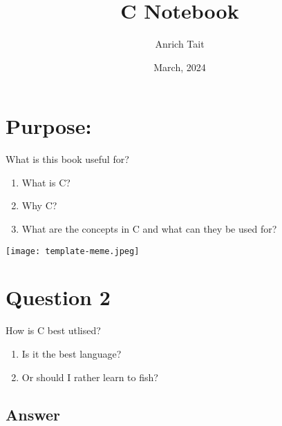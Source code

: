 \documentclass[
	12pt, %
]{fphw}
\title{C Notebook} %
\author{Anrich Tait} %
\date{March, 2024} %
\institute{ALX \\ Software Engineering} %
\begin{document}
\maketitle %


\section*{Purpose:}

\begin{problem}
	What is this book useful for?
	\begin{enumerate}
		\item What is C?
		\item Why C?
		\item What are the concepts in C and what can they be used for?
	\end{enumerate}
\end{problem}
\begin{center}
	\texttt{[image: template-meme.jpeg]} %
\end{center}

\section*{Question 2}

\begin{problem}
	How is C best utlised?	
	\medskip
	
	\begin{enumerate} %
		\item Is it the best language?
		\item Or should I rather learn to fish?
	\end{enumerate}
\end{problem}


\subsection*{Answer}
\end{document}
